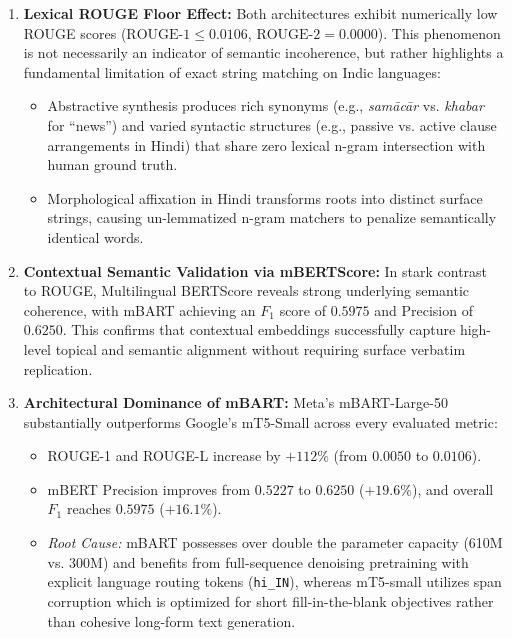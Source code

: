 \documentclass[12pt,a4paper]{report}
\begin{document}
\begin{enumerate}
    \item \textbf{Lexical ROUGE Floor Effect:} Both architectures exhibit numerically low ROUGE scores ($\text{ROUGE-1} \le 0.0106$, $\text{ROUGE-2} = 0.0000$). This phenomenon is not necessarily an indicator of semantic incoherence, but rather highlights a fundamental limitation of exact string matching on Indic languages:
    \begin{itemize}
        \item Abstractive synthesis produces rich synonyms (e.g., \textit{samācār} vs. \textit{khabar} for ``news'') and varied syntactic structures (e.g., passive vs. active clause arrangements in Hindi) that share zero lexical n-gram intersection with human ground truth.
        \item Morphological affixation in Hindi transforms roots into distinct surface strings, causing un-lemmatized n-gram matchers to penalize semantically identical words.
    \end{itemize}
    \item \textbf{Contextual Semantic Validation via mBERTScore:} In stark contrast to ROUGE, Multilingual BERTScore reveals strong underlying semantic coherence, with mBART achieving an $F_1$ score of $\mathbf{0.5975}$ and Precision of $\mathbf{0.6250}$. This confirms that contextual embeddings successfully capture high-level topical and semantic alignment without requiring surface verbatim replication.
    \item \textbf{Architectural Dominance of mBART:} Meta's mBART-Large-50 substantially outperforms Google's mT5-Small across every evaluated metric:
    \begin{itemize}
        \item ROUGE-1 and ROUGE-L increase by $+112\%$ (from $0.0050$ to $0.0106$).
        \item mBERT Precision improves from $0.5227$ to $0.6250$ ($+19.6\%$), and overall $F_1$ reaches $0.5975$ ($+16.1\%$).
        \item \textit{Root Cause:} mBART possesses over double the parameter capacity (610M vs. 300M) and benefits from full-sequence denoising pretraining with explicit language routing tokens (\texttt{hi\_IN}), whereas mT5-small utilizes span corruption which is optimized for short fill-in-the-blank objectives rather than cohesive long-form text generation.
    \end{itemize}
\end{enumerate}
\end{document}

